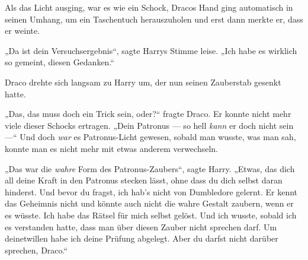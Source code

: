 Als das Licht ausging, war es wie ein Schock, Dracos Hand ging automatisch in seinen Umhang, um ein Taschentuch herauszuholen und erst dann merkte er, dass er weinte.

„Da ist dein Versuchsergebnis“, sagte Harrys Stimme leise.
„Ich habe es wirklich so gemeint, diesen Gedanken.“

Draco drehte sich langsam zu Harry um, der nun seinen Zauberstab gesenkt hatte.

„Das, das muss doch ein Trick sein, oder?“ fragte Draco. Er konnte nicht mehr viele dieser Schocks ertragen.
„Dein Patronus — so hell \emph{kann} er doch nicht sein —“ Und doch \emph{war} es Patronus-Licht gewesen, sobald man wusste, was man sah, konnte man es nicht mehr mit etwas anderem verwechseln.

„Das war die \emph{wahre} Form des Patronus-Zaubers“, sagte Harry.
„Etwas, das dich all deine Kraft in den Patronus stecken lässt, ohne dass du dich selbst daran hinderst. Und bevor du fragst, ich hab’s nicht von Dumbledore gelernt. Er kennt das Geheimnis nicht und könnte auch nicht die wahre Gestalt zaubern, wenn er es wüsste. Ich habe das Rätsel für mich selbst gelöst. Und ich wusste, sobald ich es verstanden hatte, dass man über diesen Zauber nicht sprechen darf. Um deinetwillen habe ich deine Prüfung abgelegt. Aber du darfst nicht darüber sprechen, Draco.“

